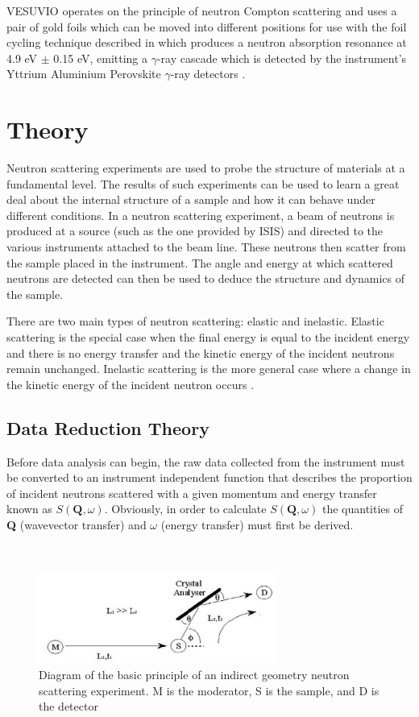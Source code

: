 \documentclass[paper=a4, fontsize=11pt]{scrartcl}	%
\numberwithin{equation}{section}															%
\numberwithin{figure}{section}																%
\numberwithin{table}{section}																%
\begin{document}
VESUVIO operates on the principle of neutron Compton scattering and uses a pair of gold foils which can be moved into different positions for use with the foil cycling technique described in \cite{schooneveld2006foil} which produces a neutron absorption resonance at 4.9 eV $\pm$ 0.15 eV, emitting a $\gamma$-ray cascade which is detected by the instrument's Yttrium Aluminium Perovskite $\gamma$-ray detectors \cite{mayers2010user}.

\clearpage
\section{Theory}
Neutron scattering experiments are used to probe the structure of materials at a fundamental level. The results of such experiments can be used to learn a great deal about the internal structure of a sample and how it can behave under different conditions. In a neutron scattering experiment, a beam of neutrons is produced at a source (such as the one provided by ISIS) and directed to the various instruments attached to the beam line. These neutrons then scatter from the sample placed in the instrument. The angle and energy at which scattered neutrons are detected can then be used to deduce the structure and dynamics of the sample.

There are two main types of neutron scattering: elastic and inelastic. Elastic scattering is the special case when the final energy is equal to the incident energy and there is no energy transfer and the kinetic energy of the incident neutrons remain unchanged. Inelastic scattering is the more general case where a change in the kinetic energy of the incident neutron occurs \cite{dssivia2011}.


\subsection{Data Reduction Theory}
Before data analysis can begin, the raw data collected from the instrument must be converted to an instrument independent function that describes the proportion of incident neutrons scattered with a given momentum and energy transfer known as $S(\mathbf{Q},\omega)$. Obviously, in order to calculate $S(\mathbf{Q},\omega)$ the quantities of \textbf{Q} (wavevector transfer) and $\omega$ (energy transfer) must first be derived.

\mbox{ }\\
\begin{figure}[H]
\centering
\includegraphics[width=0.7\textwidth]{img/instrument-diagram.png}
\caption{Diagram of the basic principle of an indirect geometry neutron scattering experiment. M is the moderator, S is the sample, and D is the detector \cite{smukhopadhyay2014}}
\label{fig:instrument-setup}
\end{figure}
\end{document}
